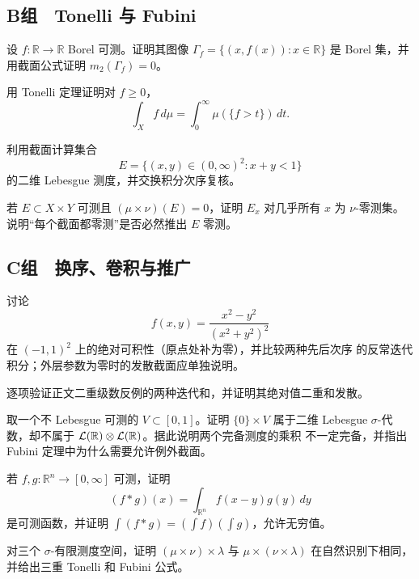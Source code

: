 \subsection*{B组　Tonelli 与 Fubini}
\begin{enumerate}[label=\textbf{\thechapter.\arabic*.},resume]
设 \(f:\mathbb R\to\mathbb R\) Borel 可测。证明其图像
\(\Gamma_f=\{(x,f(x)):x\in\mathbb R\}\) 是 Borel 集，并用截面公式证明
\(m_2(\Gamma_f)=0\)。

用 Tonelli 定理证明对 \(f\ge0\)，
\[
 \int_Xf\,d\mu=\int_0^\infty\mu(\{f>t\})\,dt.
\]

利用截面计算集合
\[
 E=\{(x,y)\in(0,\infty)^2:x+y<1\}
\]
的二维 Lebesgue 测度，并交换积分次序复核。

若 \(E\subset X\times Y\) 可测且
\((\mu\times\nu)(E)=0\)，证明 \(E_x\) 对几乎所有 \(x\) 为
\(\nu\)-零测集。说明“每个截面都零测”是否必然推出 \(E\) 零测。

\end{enumerate}
\subsection*{C组　换序、卷积与推广}
\begin{enumerate}[label=\textbf{\thechapter.\arabic*.},resume]
讨论
\[
 f(x,y)=\frac{x^2-y^2}{(x^2+y^2)^2}
\]
在 \((-1,1)^2\) 上的绝对可积性（原点处补为零），并比较两种先后次序
的反常迭代积分；外层参数为零时的发散截面应单独说明。

逐项验证正文二重级数反例的两种迭代和，并证明其绝对值二重和发散。

取一个不 Lebesgue 可测的 \(V\subset[0,1]\)。证明
\(\{0\}\times V\) 属于二维 Lebesgue \(\sigma\)-代数，却不属于
\(\mathcal L(\mathbb{R})\otimes\mathcal L(\mathbb{R})\)。据此说明两个完备测度的乘积
不一定完备，并指出 Fubini 定理中为什么需要允许例外截面。

若 \(f,g:\mathbb R^n\to[0,\infty]\) 可测，证明
\[
 (f*g)(x)=\int_{\mathbb R^n}f(x-y)g(y)\,dy
\]
是可测函数，并证明
\(\int(f*g)=(\int f)(\int g)\)，允许无穷值。

对三个 \(\sigma\)-有限测度空间，证明
\((\mu\times\nu)\times\lambda\) 与
\(\mu\times(\nu\times\lambda)\) 在自然识别下相同，并给出三重 Tonelli
和 Fubini 公式。
\end{enumerate}
